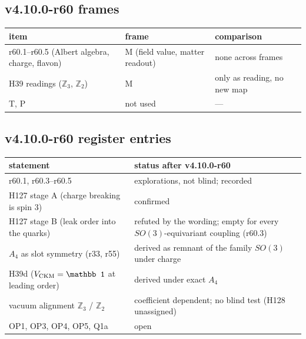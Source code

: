 \subsection*{v4.10.0-r60 frames}
\label{subsec:v4100-r60-frames}

\begin{center}
\small
\begin{tabular}{@{}p{.40\linewidth}p{.30\linewidth}p{.22\linewidth}@{}}
\toprule
item & frame & comparison\\
\midrule
r60.1--r60.5 (Albert algebra, charge, flavon) & M (field value, matter readout) & none across frames\\
H39 readings (\(\mathbb Z_3\), \(\mathbb Z_2\)) & M & only as reading, no new map\\
T, P & not used & ---\\
\bottomrule
\end{tabular}
\end{center}

\subsection*{v4.10.0-r60 register entries}
\label{subsec:v4100-r60-register}

\begin{center}
\small
\begin{tabular}{@{}>{\raggedright\arraybackslash}p{}>{\raggedright\arraybackslash}p{}@{}}
\toprule
statement & status after v4.10.0-r60\\
\midrule
r60.1, r60.3--r60.5 & explorations, not blind; recorded\\
H127 stage A (charge breaking is spin 3) & confirmed\\
H127 stage B (leak order into the quarks) & refuted by the wording; empty for every \(SO(3)\)-equivariant coupling (r60.3)\\
\(A_4\) as slot symmetry (r33, r55) & derived as remnant of the family \(SO(3)\) under charge\\
H39d (\(V_{\rm CKM}=\mathbb 1\) at leading order) & derived under exact \(A_4\)\\
vacuum alignment \(\mathbb Z_3\) / \(\mathbb Z_2\) & coefficient dependent; no blind test (H128 unassigned)\\
OP1, OP3, OP4, OP5, Q1a & open\\
\bottomrule
\end{tabular}
\end{center}

